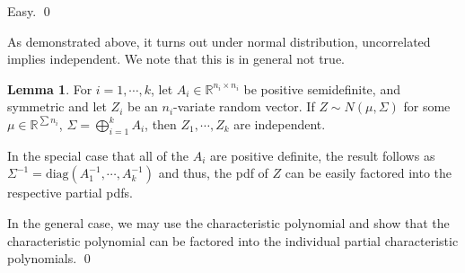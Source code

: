 \documentclass[
]{article}
\theoremstyle{definition}
\theoremstyle{definition}
\newtheorem{lemma}{Lemma}[section]
\begin{document}
Easy. \qed

As demonstrated above, it turns out under normal distribution,
uncorrelated implies independent. We note that this is in general not
true.

\begin{lemma}
  For \(i = 1, \cdots, k\), let \(A_i \in \mathbb{R}^{n_i \times n_i}\) be 
  positive semidefinite, and symmetric and let \(Z_i\) be an \(n_i\)-variate 
  random vector. If \(Z \sim N(\mu, \Sigma)\) for some \(\mu \in \mathbb{R}^{\sum n_i}\), 
  \(\Sigma = \bigoplus_{i = 1}^k A_i\), then \(Z_1, \cdots, Z_k\) are independent.
\end{lemma}
\proof

In the special case that all of the \(A_i\) are positive definite, the
result follows as
\(\Sigma^{-1} = \text{diag}(A_1^{-1}, \cdots, A_k^{-1})\) and thus, the
pdf of \(Z\) can be easily factored into the respective partial pdfs.

In the general case, we may use the characteristic polynomial and show
that the characteristic polynomial can be factored into the individual
partial characteristic polynomials. \qed
\end{document}
